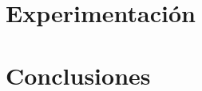 \documentclass[11pt]{beamer}    %
\begin{document}
    \section{Experimentación}

    \section{Conclusiones}
\end{document}
